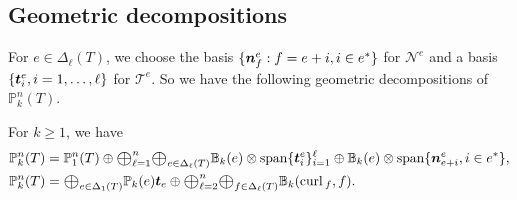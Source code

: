 \documentclass[mathpazo]{cicp}
\newcommand{\Oplus}{\ensuremath{\vcenter{\hbox{\scalebox{1.5}{$\oplus$}}}}}
\begin{document}
\subsection{Geometric decompositions}
For $e\in\Delta_{\ell}(T)$, we choose the basis $\{\boldsymbol n_{f}^e: f = e+i, i\in e^*\}$ for $\mathscr{N}^e$ and a basis $\{\boldsymbol t_i^e,  i=1,\ldots,\ell\}$ for $\mathscr{T}^e$. So we have the following geometric decompositions of $\mathbb P_k^n(T) $. 
\begin{theorem}
For $k\geq 1$, we have
\begin{align}
\label{eq:curlpolynomialdecomp}
\mathbb P_k^n(T) &= \mathbb P_1^n(T) \oplus \Oplus_{\ell=1}^n \Oplus_{e\in\Delta_{\ell}(T)}\mathbb B_k(e)\otimes \spa\{\bs t_i^e\}_{i=1}^{\ell} \oplus \mathbb B_k(e)\otimes \spa\{\bs n_{e+i}^e, i\in e^*\},\\
\label{eq:curlpolynomialdecomp2}
\mathbb P_k^n(T) &= \Oplus_{e\in \Delta_1(T)}\mathbb P_k(e)\bs t_e \oplus \Oplus_{\ell=2}^n\Oplus_{f\in\Delta_{\ell}(T)}\mathbb B_k(\curl_f, f).
\end{align}
\end{theorem}
\end{document}

